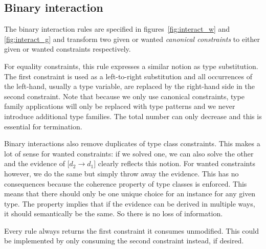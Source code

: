 \subsection{Binary interaction}
\label{sec:binary-interaction}
The binary interaction rules are specified in figures~\ref{fig:interact_w} and
\ref{fig:interact_g} and transform two given or wanted \textit{canonical
constraints} to either given or wanted constraints respectively.

For equality constraints, this rule expresses a similar notion as type
substitution. The first constraint is used as a left-to-right substitution and
all occurrences of the left-hand, usually a type variable, are replaced by the
right-hand side in the second constraint. Note that because we only use
canonical constraints, type family applications will only be replaced with type
patterns and we never introduce additional type families. The total number can
only decrease and this is essential for termination.

Binary interactions also remove duplicates of type class constraints. This
makes a lot of sense for wanted constraints: if we solved one, we can also solve
the other and the evidence of $[d_2 \rightarrow d_1$] clearly reflects this
notion. For wanted constraints however, we do the same but simply throw away the
evidence. This has no consequences because the coherence property of type
classes is enforced. This means that there should only be one unique choice for
an instance for any given type. The property implies that if the evidence can be
derived in multiple ways, it should semantically be the same. So there is no
loss of information.

Every rule always returns the first constraint it consumes unmodified. This
could be implemented by only consuming the second constraint instead, if desired.

